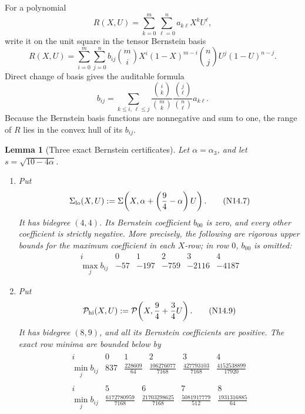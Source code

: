 \documentclass[11pt]{article}
\newtheorem{lemma}[theorem]{Lemma}
\theoremstyle{definition}
\theoremstyle{remark}
\begin{document}
For a polynomial
\[
 R(X,U)=\sum_{k=0}^m\sum_{\ell=0}^n a_{k\ell}X^kU^\ell,
\]
write it on the unit square in the tensor Bernstein basis
\[
 R(X,U)=\sum_{i=0}^m\sum_{j=0}^n
 b_{ij}\binom miX^i(1-X)^{m-i}
       \binom njU^j(1-U)^{n-j}.
 \tag{N14.5}
\]
Direct change of basis gives the auditable formula
\[
 b_{ij}=
 \sum_{k\leq i,\,\ell\leq j}
 \frac{\binom ik}{\binom mk}
 \frac{\binom j\ell}{\binom n\ell}a_{k\ell}.
 \tag{N14.6}
\]
Because the Bernstein basis functions are nonnegative and sum to one, the
range of \(R\) lies in the convex hull of its \(b_{ij}\).

\begin{lemma}[Three exact Bernstein certificates]
\label{lem:f2v14-bernstein}
Let \(\alpha=\alpha_3\), and let \(s=\sqrt{10-4\alpha}\).

\begin{enumerate}[label=\textup{(\roman*)}]
\item Put
\[
 \Sigma_{\rm lo}(X,U):=
 \Sigma\!\left(X,\alpha+\left(\frac94-\alpha\right)U\right).
 \tag{N14.7}
\]
It has bidegree \((4,4)\).  Its Bernstein coefficient \(b_{00}\) is zero,
and every other coefficient is strictly negative.  More precisely, the
following are rigorous upper bounds for the maximum coefficient in each
\(X\)-row; in row \(0\), \(b_{00}\) is omitted:
\[
\begin{array}{c|rrrrr}
 i&0&1&2&3&4\\ \hline
 \max_j b_{ij}
 &-57&-197&-759&-2116&-4187
\end{array}
\tag{N14.8}
\]

\item Put
\[
 \mathcal P_{\rm hi}(X,U):=
 \mathcal P\!\left(X,\frac94+\frac34U\right).
 \tag{N14.9}
\]
It has bidegree \((8,9)\), and all its Bernstein coefficients are positive.
The exact row minima are bounded below by
\[
\begin{gathered}
\begin{array}{c|rrrrr}
 i&0&1&2&3&4\\ \hline
 \min_j b_{ij}
 &837&\frac{228609}{64}&\frac{106276077}{7168}
 &\frac{427793103}{7168}&\frac{4152538899}{17920}
\end{array}\\[2mm]
\begin{array}{c|rrrr}
 i&5&6&7&8\\ \hline
 \min_j b_{ij}
 &\frac{6172780959}{7168}&\frac{21703298625}{7168}
 &\frac{5081917779}{512}&\frac{1931316885}{64}
\end{array}
\end{gathered}
\tag{N14.10}
\]


\end{enumerate}
\end{lemma}
\end{document}
